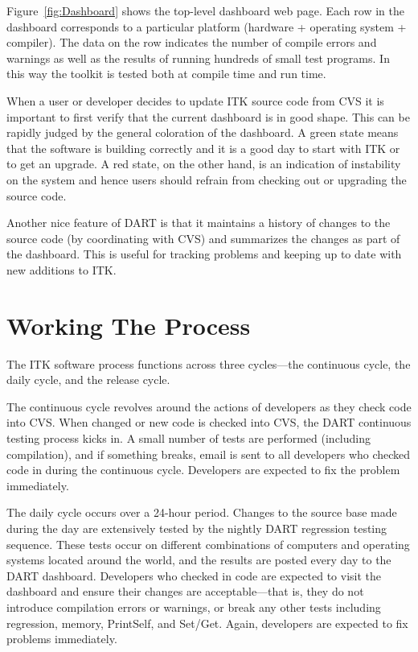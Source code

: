 Figure~\ref{fig:Dashboard} shows the top-level dashboard web page. Each row
in the dashboard corresponds to a particular platform (hardware + operating
system + compiler). The data on the row indicates the number of compile
errors and warnings as well as the results of running hundreds of
small test programs. In this way the toolkit is tested both at compile time
and run time.

When a user or developer decides to update ITK source code from CVS it is
important to first verify that the current dashboard is in good shape. This
can be rapidly judged by the general coloration of the dashboard. A green
state means that the software is building correctly and it is a good day to
start with ITK or to get an upgrade. A red state, on the other hand, is an
indication of instability on the system and hence users should refrain from
checking out or upgrading the source code.

Another nice feature of DART is that it maintains a history of changes to the
source code (by coordinating with CVS) and summarizes the changes as part of
the dashboard. This is useful for tracking problems and keeping up to date
with new additions to ITK.

\section{Working The Process}
\label{sec:WorkingTheProcess}

The ITK software process functions across three cycles---the continuous
cycle, the daily cycle, and the release cycle.

The continuous cycle revolves around the actions of developers as they check
code into CVS. When changed or new code is checked into CVS, the DART
continuous testing process kicks in. A small number of tests are performed
(including compilation), and if something breaks, email is sent to all
developers who checked code in during the continuous cycle. Developers are
expected to fix the problem immediately.

The daily cycle occurs over a 24-hour period. Changes to the source base made
during the day are extensively tested by the nightly DART regression testing
sequence. These tests occur on different combinations of computers and
operating systems located around the world, and the results are posted every
day to the DART dashboard. Developers who checked in code are expected to
visit the dashboard and ensure their changes are acceptable---that is, they
do not introduce compilation errors or warnings, or break any other tests
including regression, memory, PrintSelf, and Set/Get. Again, developers are
expected to fix problems immediately.

